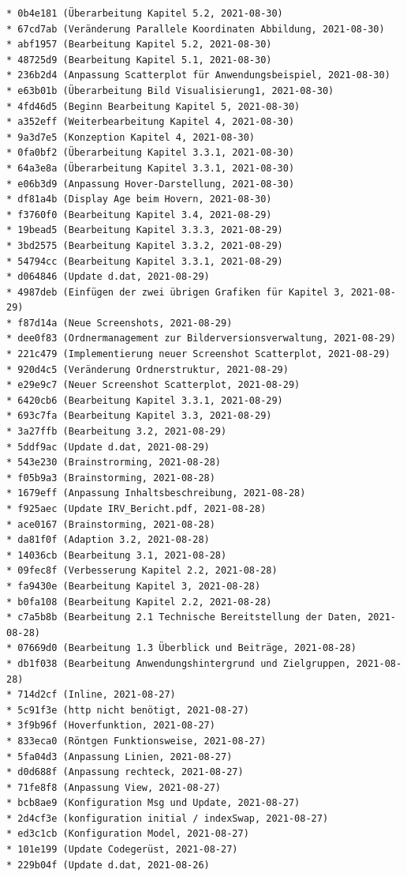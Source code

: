 \documentclass[usegeometry=true]{scrartcl}
\begin{document}
\begin{verbatim}
* 0b4e181 (Überarbeitung Kapitel 5.2, 2021-08-30)
* 67cd7ab (Veränderung Parallele Koordinaten Abbildung, 2021-08-30)
* abf1957 (Bearbeitung Kapitel 5.2, 2021-08-30)
* 48725d9 (Bearbeitung Kapitel 5.1, 2021-08-30)
* 236b2d4 (Anpassung Scatterplot für Anwendungsbeispiel, 2021-08-30)
* e63b01b (Überarbeitung Bild Visualisierung1, 2021-08-30)
* 4fd46d5 (Beginn Bearbeitung Kapitel 5, 2021-08-30)
* a352eff (Weiterbearbeitung Kapitel 4, 2021-08-30)
* 9a3d7e5 (Konzeption Kapitel 4, 2021-08-30)
* 0fa0bf2 (Überarbeitung Kapitel 3.3.1, 2021-08-30)
* 64a3e8a (Überarbeitung Kapitel 3.3.1, 2021-08-30)
* e06b3d9 (Anpassung Hover-Darstellung, 2021-08-30)
* df81a4b (Display Age beim Hovern, 2021-08-30)
* f3760f0 (Bearbeitung Kapitel 3.4, 2021-08-29)
* 19bead5 (Bearbeitung Kapitel 3.3.3, 2021-08-29)
* 3bd2575 (Bearbeitung Kapitel 3.3.2, 2021-08-29)
* 54794cc (Bearbeitung Kapitel 3.3.1, 2021-08-29)
* d064846 (Update d.dat, 2021-08-29)
* 4987deb (Einfügen der zwei übrigen Grafiken für Kapitel 3, 2021-08-29)
* f87d14a (Neue Screenshots, 2021-08-29)
* dee0f83 (Ordnermanagement zur Bilderversionsverwaltung, 2021-08-29)
* 221c479 (Implementierung neuer Screenshot Scatterplot, 2021-08-29)
* 920d4c5 (Veränderung Ordnerstruktur, 2021-08-29)
* e29e9c7 (Neuer Screenshot Scatterplot, 2021-08-29)
* 6420cb6 (Bearbeitung Kapitel 3.3.1, 2021-08-29)
* 693c7fa (Bearbeitung Kapitel 3.3, 2021-08-29)
* 3a27ffb (Bearbeitung 3.2, 2021-08-29)
* 5ddf9ac (Update d.dat, 2021-08-29)
* 543e230 (Brainstrorming, 2021-08-28)
* f05b9a3 (Brainstorming, 2021-08-28)
* 1679eff (Anpassung Inhaltsbeschreibung, 2021-08-28)
* f925aec (Update IRV_Bericht.pdf, 2021-08-28)
* ace0167 (Brainstorming, 2021-08-28)
* da81f0f (Adaption 3.2, 2021-08-28)
* 14036cb (Bearbeitung 3.1, 2021-08-28)
* 09fec8f (Verbesserung Kapitel 2.2, 2021-08-28)
* fa9430e (Bearbeitung Kapitel 3, 2021-08-28)
* b0fa108 (Bearbeitung Kapitel 2.2, 2021-08-28)
* c7a5b8b (Bearbeitung 2.1 Technische Bereitstellung der Daten, 2021-08-28)
* 07669d0 (Bearbeitung 1.3 Überblick und Beiträge, 2021-08-28)
* db1f038 (Bearbeitung Anwendungshintergrund und Zielgruppen, 2021-08-28)
* 714d2cf (Inline, 2021-08-27)
* 5c91f3e (http nicht benötigt, 2021-08-27)
* 3f9b96f (Hoverfunktion, 2021-08-27)
* 833eca0 (Röntgen Funktionsweise, 2021-08-27)
* 5fa04d3 (Anpassung Linien, 2021-08-27)
* d0d688f (Anpassung rechteck, 2021-08-27)
* 71fe8f8 (Anpassung View, 2021-08-27)
* bcb8ae9 (Konfiguration Msg und Update, 2021-08-27)
* 2d4cf3e (konfiguration initial / indexSwap, 2021-08-27)
* ed3c1cb (Konfiguration Model, 2021-08-27)
* 101e199 (Update Codegerüst, 2021-08-27)
* 229b04f (Update d.dat, 2021-08-26)

\end{verbatim}
\end{document}

